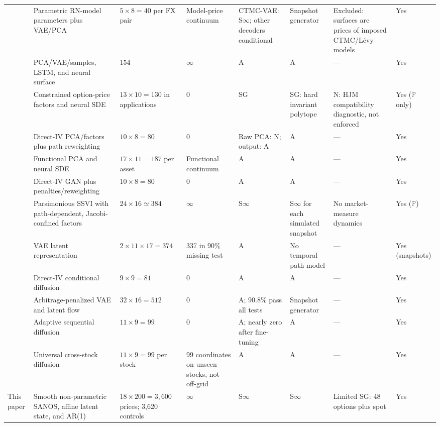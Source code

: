 \documentclass[11pt,a4paper]{article}
\renewcommand{\P}{\mathbb{P}}
\begin{document}
\begin{landscape}
\begin{table}[p]
\begin{tabular}{@{}p{3.8cm}p{3.0cm}p{2.5cm}p{1.3cm}p{2.2cm}p{2.2cm}p{3.2cm}p{1.7cm}@{}}
\citet{vae_ning2023arbitrage}
  & Parametric RN-model parameters plus VAE/PCA & $5\times8=40$ per FX pair & Model-price continuum & CTMC-VAE: S$\infty$; other decoders conditional & Snapshot generator & Excluded: surfaces are prices of imposed CTMC/L\'evy models & Yes \\
\citet{ZhangLiZhang2021}
  & PCA/VAE/samples, LSTM, and neural surface & 154 & $\infty$ & A & A & --- & Yes \\
\citet{Cohen02012023}
  & Constrained option-price factors and neural SDE & $13\times10=130$ in applications & 0 & SG & SG: hard invariant polytope & N: HJM compatibility diagnostic, not enforced & Yes ($\P$ only) \\
\citet{ContVuletic2023}
  & Direct-IV PCA/factors plus path reweighting & $10\times8=80$ & 0 & Raw PCA: N; output: A & A & --- & Yes \\
\citet{ChoudharyJaimungalBergeron2024}
  & Functional PCA and neural SDE & $17\times11=187$ per asset & Functional continuum & A & A & --- & Yes \\
\citet{VuleticCont2024}
  & Direct-IV GAN plus penalties/reweighting & $10\times8=80$ & 0 & A & A & --- & Yes \\
\citet{AndresBoumezouedJourdain2023}
  & Parsimonious SSVI with path-dependent, Jacobi-confined factors & $24\times16\simeq384$ & $\infty$ & S$\infty$ & S$\infty$ for each simulated snapshot & No market-measure dynamics & Yes ($\P$) \\
\citet{GolubitskyDavisonCaraman2026}
  & VAE latent representation & $2\times11\times17=374$ & 337 in 90\% missing test & A & No temporal path model & --- & Yes (snapshots) \\
\citet{JinAgarwal2025}
  & Direct-IV conditional diffusion & $9\times9=81$ & 0 & A & A & --- & Yes \\
\citet{BrooksEtAl2026}
  & Arbitrage-penalized VAE and latent flow & $32\times16=512$ & 0 & A; 90.8\% pass all tests & Snapshot generator & --- & Yes \\
\citet{HanEtAl2026}
  & Adaptive sequential diffusion & $11\times9=99$ & 0 & A; nearly zero after fine-tuning & A & --- & Yes \\
\citet{YangWangZhangLi2026}
  & Universal cross-stock diffusion & $11\times9=99$ per stock & 99 coordinates on unseen stocks, not off-grid & A & A & --- & Yes \\
This paper
  & Smooth non-parametric SANOS, affine latent state, and AR(1) & $18\times200=3{,}600$ prices; 3,620 controls & $\infty$ & S$\infty$ & S$\infty$ & Limited SG: 48 options plus spot & Yes \\
\bottomrule
\end{tabular}
\end{table}
\end{landscape}
\fi
\end{document}
